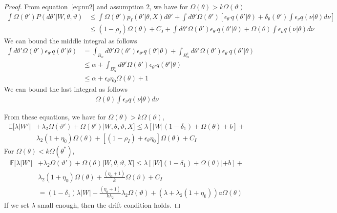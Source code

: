 \begin{proof}
From equation~\eqref{eq:nu2} and assumption 2, we have for 
$\Omega(\theta) > k\Omega(\vartheta)$
\begin{align*}
\int \Omega(\theta')P(d\theta'| W, \theta, \vartheta)  &\leq 
\int \Omega(\theta') p_I(\theta'|\theta,X) d\theta' +\int d\theta'
\Omega(\theta') \left[ \epsilon_{\theta'}q(\theta'|\theta)+
\delta_\theta(\theta')\int \epsilon_{\nu} q(\nu|\theta) d\nu \right] \\
&\leq (1-\rho_I) \Omega(\theta)  + C_I  + \int d\theta'
\Omega(\theta') \epsilon_{\theta'}q(\theta'|\theta)+
\Omega(\theta)\int \epsilon_{\nu} q(\nu|\theta) d\nu 
\end{align*}
We can bound the middle integral as follows
\begin{align*}
  \int d\theta'\Omega(\theta')  \epsilon_{\theta'} q(\theta'|\theta) &=  
  \int_{B_\alpha} d\theta'\Omega(\theta')  \epsilon_{\theta'} q(\theta'|\theta) +  
  \int_{B_\alpha^c} d\theta'\Omega(\theta')  \epsilon_{\theta'}
  q(\theta'|\theta)  \\
  &\le \alpha +  
  \int_{B_\alpha^c} d\theta'\Omega(\theta')  \epsilon_{\theta'} q(\theta'|\theta) \\
  &\le \alpha + \epsilon_\theta \eta_0 \Omega(\theta)+1
\end{align*}
We can bound the last integral as follows
\begin{align*}
\Omega(\theta)\int \epsilon_{\nu} q(\nu|\theta) d\nu 
\end{align*}

From these equations, we have for $\Omega(\theta) > k \Omega(\vartheta)$,
\begin{align*}
  \mathbb{E}[\lambda |W'| &+ \lambda_2 \Omega(\vartheta') + \Omega(\theta')| 
  W, \theta, \vartheta, X] \leq 
  \lambda \left[|W|(1 - \delta_1) +  \Omega(\theta) + b\right] + \\
  & \lambda_2 (1+\eta_0)\Omega(\theta) +
  \left[(1-\rho_I)  +\epsilon_\theta \eta_0 \right] \Omega(\theta) + C_I 
\end{align*}
For $\Omega(\theta) < k \Omega(\theta^*)$,
\begin{align*}
  \mathbb{E}[\lambda |W'| &+ \lambda_2 \Omega(\vartheta') +
  \Omega(\theta)| W, \theta, \vartheta, X] \leq 
  \lambda \left[|W|(1 - \delta_1) +  \Omega(\theta)| + b\right] + \\
& \lambda_2(1+\eta_0) \Omega(\theta) +
    \frac{(\eta_0 + 1)}{k} \Omega(\vartheta) + C_I \\
    &= (1-\delta_1)\lambda|W| + \frac{(\eta_0 + 1)}{k\lambda_2} \lambda_2\Omega(\vartheta)+
    (\lambda + \lambda_2(1+\eta_0))a\Omega(\theta)
\end{align*}
If we set  $\lambda$ small enough, then the drift condition holds.
\end{proof}
